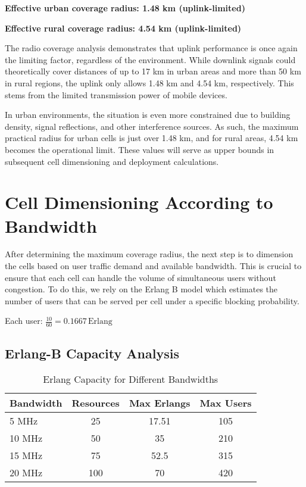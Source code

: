 \documentclass[a4paper,12pt]{article}
\begin{document}
\textbf{Effective urban coverage radius: 1.48 km (uplink-limited)}

\textbf{Effective rural coverage radius: 4.54 km (uplink-limited)}

\bigskip

The radio coverage analysis demonstrates that uplink performance is once again the limiting factor, regardless of the environment. While downlink signals could theoretically cover distances of up to 17 km in urban areas and more than 50 km in rural regions, the uplink only allows 1.48 km and 4.54 km, respectively. This stems from the limited transmission power of mobile devices.

In urban environments, the situation is even more constrained due to building density, signal reflections, and other interference sources. As such, the maximum practical radius for urban cells is just over 1.48 km, and for rural areas, 4.54 km becomes the operational limit. These values will serve as upper bounds in subsequent cell dimensioning and deployment calculations.

\section{Cell Dimensioning According to Bandwidth}

After determining the maximum coverage radius, the next step is to dimension the cells based on user traffic demand and available bandwidth. This is crucial to ensure that each cell can handle the volume of simultaneous users without congestion. To do this, we rely on the Erlang B model which estimates the number of users that can be served per cell under a specific blocking probability.

\bigskip

Each user: $\frac{10}{60} = 0.1667\,\text{Erlang}$

\subsection*{Erlang-B Capacity Analysis}
\begin{table}[h]
\centering
\begin{tabular}{lccc}
\toprule
Bandwidth & Resources & Max Erlangs & Max Users \\
\midrule
5 MHz & 25 & 17.51 & 105 \\
10 MHz & 50 & 35 & 210 \\
15 MHz & 75 & 52.5 & 315 \\
20 MHz & 100 & 70 & 420 \\
\bottomrule
\end{tabular}
\caption{Erlang Capacity for Different Bandwidths}
\label{tab:erlang-capacity}
\end{table}
\end{document}
